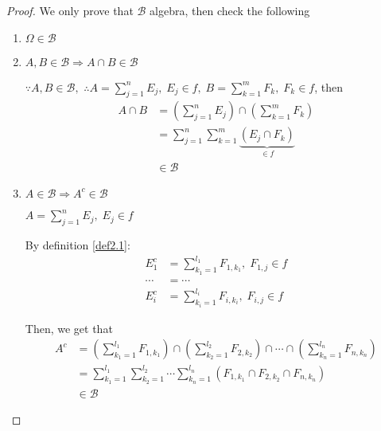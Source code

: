 \begin{proof}
	We only prove that  $ \mathcal{B} $ algebra, then check the following
	\begin{enumerate}
		\item $ \Omega \in \mathcal{B} $
		\item $A,B \in \mathcal{B} \Rightarrow A \cap B \in \mathcal{B}$
		
		$ \because A,B \in \mathcal{B}, $ $ \therefore A = \sum\limits_{j = 1}^n {{E_j}} ,\;{E_j} \in f,\;B = \sum\limits_{k = 1}^m {{F_k}} ,\;{F_k} \in f$, then 
		\begin{equation}
		\begin{split}
		A \cap B & = \left( {\sum\limits_{j = 1}^n {{E_j}} } \right) \cap \left( {\sum\limits_{k = 1}^m {{F_k}} } \right)\\
				 & = \sum\limits_{j = 1}^n {\sum\limits_{k = 1}^m {\underbrace {\left( {{E_j} \cap {F_k}} \right)}_{ \in f}} } \\
				 & \in  \mathcal{B}
		\end{split}
		\end{equation}
		
		\item $ A \in \mathcal{B} \Rightarrow A^{c} \in \mathcal{B} $
		
		$A = \sum\limits_{j = 1}^n {{E_j}} ,\;{E_j} \in f$ 
		
		By definition \ref{def2.1}:
		\begin{equation}
		\begin{split}
		E_1^c  & = \sum\limits_{{k_1} = 1}^{{l_1}} {{F_{1,{k_1}}}} ,\;{F_{1,j}} \in f \\
		\cdots & =  \cdots \\
		E_i^c & = \sum\limits_{{k_i} = 1}^{{l_i}} {{F_{i,{k_i}}}} ,\;{F_{i,j}} \in f
		\end{split}
		\end{equation}
		
		Then, we get that 
		\begin{equation}
		\begin{split}
		{A^c} & = \left( {\sum\limits_{{k_1} = 1}^{{l_1}} {{F_{1,{k_1}}}} } \right) \cap \left( {\sum\limits_{{k_2} = 1}^{{l_2}} {{F_{2,{k_2}}}} } \right) \cap  \cdots  \cap \left( {\sum\limits_{{k_n} = 1}^{{l_n}} {{F_{n,{k_n}}}} } \right)\\
		      &  = \sum\limits_{{k_1} = 1}^{{l_1}} {\sum\limits_{{k_2} = 1}^{{l_2}} { \cdots \sum\limits_{{k_n} = 1}^{{l_n}} {\left( {{F_{1,{k_1}}} \cap {F_{2,{k_2}}} \cap {F_{n,{k_n}}}} \right)} } } \\
		      & \in \mathcal{B}
		\end{split}
		\end{equation}
	\end{enumerate}
\end{proof}

